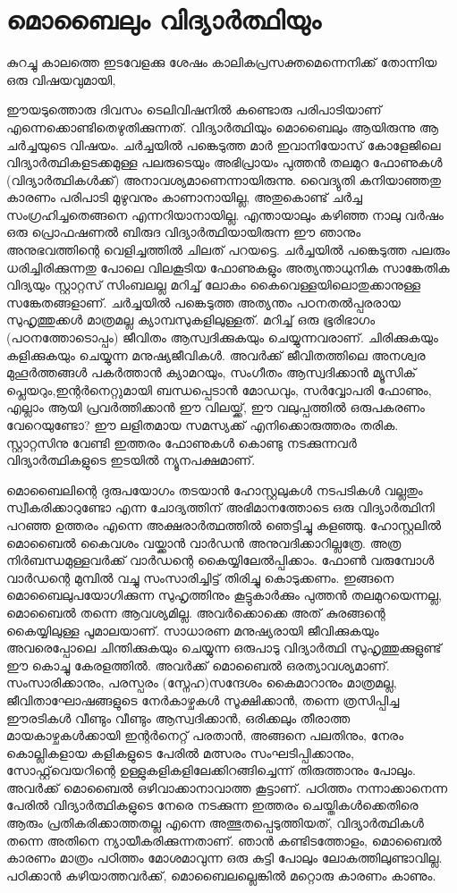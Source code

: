 \section*{മൊബൈലും വിദ്യാര്‍ത്ഥിയും}
\vskip 2pt

കുറച്ചു കാലത്തെ ഇടവേളക്കു ശേഷം കാലികപ്രസക്തമെന്നെനിക്ക് തോന്നിയ ഒരു വിഷയവുമായി,

ഈയടുത്തൊരു ദിവസം ടെലിവിഷനില്‍ കണ്ടൊരു പരിപാടിയാണ് എന്നെക്കൊണ്ടിതെഴുതിക്കുന്നത്. 
വിദ്യാര്‍ത്ഥിയും മൊബൈലും ആയിരുന്നു ആ ചര്‍ച്ചയുടെ വിഷയം. ചര്‍ച്ചയില്‍ പങ്കെടുത്ത മാര്‍ ഇവാനിയോസ് കോളേജിലെ 
വിദ്യാര്‍ത്ഥികളടക്കമുള്ള പലരുടെയും അഭിപ്രായം പുത്തന്‍ തലമുറ ഫോണുകള്‍ (വിദ്യാര്‍ത്ഥികള്‍ക്ക്) അനാവശ്യമാണെന്നായിരുന്നു.
 വൈദ്യുതി കനിയാഞ്ഞതു കാരണം പരിപാടി മുഴുവനും കാണാനായില്ല, അതുകൊണ്ട് ചര്‍ച്ച സംഗ്രഹിച്ചതെങ്ങനെ
 എന്നറിയാനായില്ല. എന്തായാലും കഴിഞ്ഞ നാലു വര്‍ഷം ഒരു പ്രൊഫഷണല്‍ ബിരുദ വിദ്യാര്‍ത്ഥിയായിരുന്ന 
ഈ ഞാനും അനുഭവത്തിന്റെ വെളിച്ചത്തില്‍ ചിലത് പറയട്ടെ. ചര്‍ച്ചയില്‍ പങ്കെടുത്ത പലരും ധരിച്ചിരിക്കുന്നതു
 പോലെ വിലകൂടിയ ഫോണുകളും അത്യന്താധുനിക സാങ്കേതിക വിദ്യയും സ്റ്റാറ്റസ് സിംബലല്ല മറിച്ച് ലോകം 
കൈവെള്ളയിലൊതുക്കാനുള്ള സങ്കേതങ്ങളാണ്. ചര്‍ച്ചയില്‍ പങ്കെടുത്ത അത്യന്തം പഠനതല്‍പ്പരരായ സുഹൃത്തുക്കള്‍ 
മാത്രമല്ല ക്യാമ്പസുകളിലുള്ളത്. മറിച്ച് ഒരു ഭൂരിഭാഗം (പഠനത്തോടൊപ്പം) ജീവിതം ആസ്വദിക്കുകയും ചെയ്യുന്നവരാണ്. 
ചിരിക്കുകയും കളിക്കുകയും ചെയ്യുന്ന മനുഷ്യജീവികള്‍. അവര്‍ക്ക് ജീവിതത്തിലെ അനശ്വര മുഹൂര്‍ത്തങ്ങള്‍ പകര്‍ത്താന്‍ 
ക്യാമറയും, സംഗീതം ആസ്വദിക്കാന്‍ മ്യൂസിക് പ്ലെയറും,ഇന്റര്‍നെറ്റുമായി ബന്ധപ്പെടാന്‍ മോഡവും, സര്‍വ്വോപരി ഫോണും, 
എല്ലാം ആയി പ്രവര്‍ത്തിക്കാന്‍ ഈ വിലയ്ക്ക്, ഈ വലുപ്പത്തില്‍ ഒരുപകരണം വേറെയുണ്ടോ? ഈ ലളിതമായ സമസ്യക്ക് 
എനിക്കൊരുത്തരം തരിക. സ്റ്റാറ്റസിനു വേണ്ടി ഇത്തരം ഫോണുകള്‍ കൊണ്ടു നടക്കുന്നവര്‍ വിദ്യാര്‍ത്ഥികളുടെ ഇടയില്‍
 ന്യൂനപക്ഷമാണ്.

മൊബൈലിന്റെ ദുരുപയോഗം തടയാന്‍ ഹോസ്റ്റലുകള്‍ നടപടികള്‍ വല്ലതും സ്വീകരിക്കാറുണ്ടോ എന്ന ചോദ്യത്തിന് 
അഭിമാനത്തോടെ ഒരു വിദ്യാര്‍ത്ഥിനി പറഞ്ഞ ഉത്തരം എന്നെ അക്ഷരാര്‍ത്ഥത്തില്‍ ഞെട്ടിച്ചു കളഞ്ഞു. ഹോസ്റ്റലില്‍ 
മൊബൈല്‍ കൈവശം വയ്ക്കാന്‍ വാര്‍ഡന്‍ അനുവദിക്കാറില്ലത്രേ. അത്ര നിര്‍ബന്ധമുള്ളവര്‍ക്ക് വാര്‍ഡന്റെ കൈയ്യിലേല്‍പ്പിക്കാം. 
ഫോണ്‍ വരുമ്പോള്‍ വാര്‍ഡന്റെ മുമ്പില്‍ വച്ചു സംസാരിച്ചിട്ട് തിരിച്ചു കൊടുക്കണം. ഇങ്ങനെ മൊബൈലുപയോഗിക്കുന്ന 
സുഹൃത്തിനും കൂട്ടുകാര്‍ക്കും പുത്തന്‍ തലമുറയെന്നല്ല, മൊബൈല്‍ തന്നെ ആവശ്യമില്ല. അവര്‍ക്കൊക്കെ അത് കുരങ്ങന്റെ 
കൈയ്യിലുള്ള പൂമാലയാണ്. സാധാരണ മനുഷ്യരായി ജീവിക്കുകയും അവരെപ്പോലെ ചിന്തിക്കുകയും ചെയ്യുന്ന ഒരുപാടു 
വിദ്യാര്‍ത്ഥി സുഹൃത്തുക്കുളുണ്ട് ഈ കൊച്ചു കേരളത്തില്‍. അവര്‍ക്ക് മൊബൈല്‍ ഒരത്യാവശ്യമാണ്. സംസാരിക്കാനും, 
പരസ്പരം (സ്നേഹ)സന്ദേശം കൈമാറാനും മാത്രമല്ല, ജീവിതാഘോഷങ്ങളുടെ നേര്‍കാഴ്ചകള്‍ സൂക്ഷിക്കാന്‍, തന്നെ 
ത്രസിപ്പിച്ച ഈരടികള്‍ വീണ്ടും വീണ്ടും ആസ്വദിക്കാന്‍, ഒരിക്കലും തീരാത്ത മായകാഴ്ചകള്‍ക്കായി ഇന്റര്‍നെറ്റ് പരതാന്‍,
 അങ്ങനെ പലതിനും, നേരം കൊല്ലികളായ കളികളുടെ പേരില്‍ മത്സരം സംഘടിപ്പിക്കാനും, സോഫ്റ്റ്‌വെയറിന്റെ
 ഉള്ളുകളികളിലേക്കിറങ്ങിച്ചെന്ന് തിരുത്താനും പോലും. അവര്‍ക്ക് മൊബൈല്‍ ഒഴിവാക്കാനാവാത്ത കൂട്ടാണ്. 
പഠിത്തം നന്നാക്കാനെന്ന പേരില്‍ വിദ്യാര്‍ത്ഥികളുടെ നേരെ നടക്കുന്ന ഇത്തരം ചെയ്തികള്‍ക്കെതിരെ ആരും
 പ്രതികരിക്കാത്തതല്ല എന്നെ അത്ഭുതപ്പെടുത്തിയത്, വിദ്യാര്‍ത്ഥികള്‍ തന്നെ അതിനെ ന്യായീകരിക്കുന്നതാണ്. 
ഞാന്‍ കണ്ടിടത്തോളം, മൊബൈല്‍ കാരണം മാത്രം പഠിത്തം മോശമാവുന്ന ഒരു കുട്ടി പോലും ലോകത്തിലുണ്ടാവില്ല.
 പഠിക്കാന്‍ കഴിയാത്തവര്‍ക്ക്, മൊബൈലല്ലെങ്കില്‍ മറ്റൊരു കാരണം കാണും.

